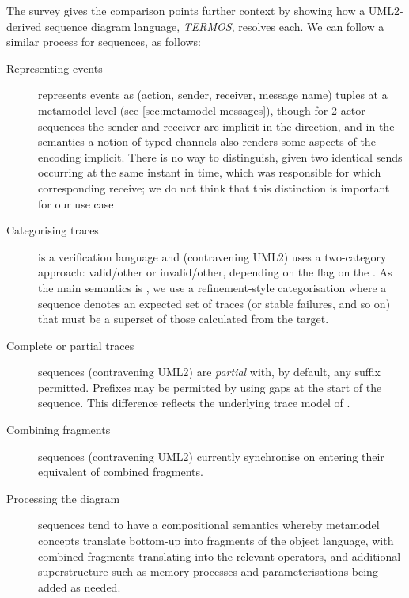 The survey gives the comparison points further context by showing how a
UML2-derived sequence diagram language, \emph{TERMOS}, resolves each.
We can follow a similar process for \langname{} sequences, as follows:

\begin{description}
\item[Representing events]
  \langname{} represents events as (action, sender, receiver, message name)
  tuples at a metamodel level (see \cref{sec:metamodel-messages}),
  though for 2-actor sequences the sender and
  receiver are implicit in the direction, and in the \tockcsp{} semantics a
  notion of typed channels also renders some aspects of the encoding implicit.
  There is no way to distinguish, given two identical sends occurring at the
  same instant in time, which was responsible for which corresponding receive;
  we do not think that this distinction is important for our use case
\item[Categorising traces]
  \langname{} is a verification language and (contravening UML2)
  uses a two-category approach: valid/other or invalid/other, depending on the
   flag on the \massertion.
  As the main \langname{} semantics is \tockcsp, we use a
  refinement-style categorisation where a sequence denotes an
  expected set of traces (or stable failures, and so on) that must be a superset
  of those calculated from the target.
\item[Complete or partial traces]
  \langname{} sequences (contravening UML2) are \emph{partial} with, by default,
  any suffix permitted.  Prefixes may be permitted by using gaps at the start of
  the sequence.  This difference reflects the underlying trace model of \tockcsp.
\item[Combining fragments]
  \langname{} sequences (contravening UML2) currently synchronise on entering
  their equivalent of combined fragments.  
\item[Processing the diagram]
  \langname{} sequences tend to have a compositional semantics whereby metamodel
  concepts translate bottom-up into fragments of
  the object language, with combined fragments translating into the relevant
  operators,
  and additional superstructure such as memory processes and parameterisations
  being added as needed.

\end{description}
